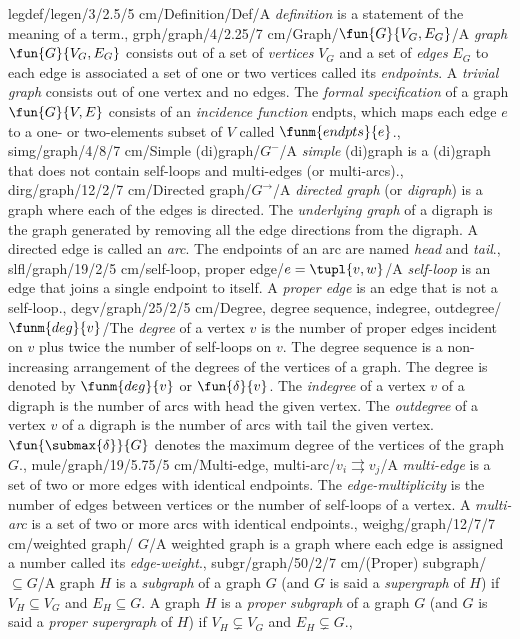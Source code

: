legdef/legen/3/2.5/5 cm/Definition/Def/{A \emph{definition} is a statement of the meaning of a term.},%
grph/graph/4/2.25/7 cm/Graph/{$\fun{G}{V_G,E_G}$}/{A \emph{graph} $\fun{G}{V_G,E_G}$ consists out of a set of \emph{vertices} $V_G$ and a set of \emph{edges} $E_G$ to each edge is associated a set of one or two vertices called its \emph{endpoints}. A \emph{trivial graph} consists out of one vertex and no edges. The \emph{formal specification} of a graph $\fun{G}{V,E}$ consists of an \emph{incidence function} $\mbox{endpts}$, which maps each edge $e$ to a one- or two-elements subset of $V$ called $\funm{endpts}{e}$.},
simg/graph/4/8/7 cm/{Simple (di)graph}/$G^{-}$/{A \emph{simple} (di)graph is a (di)graph that does not contain self-loops and multi-edges (or multi-arcs).},
dirg/graph/12/2/7 cm/{Directed graph}/$G^{\rightarrow}$/{A \emph{directed graph} (or \emph{digraph}) is a graph where each of the edges is directed. The \emph{underlying graph} of a digraph is the graph generated by removing all the edge directions from the digraph. A directed edge is called an \emph{arc}. The endpoints of an arc are named \emph{head} and \emph{tail}.},
slfl/graph/19/2/5 cm/{self-loop, proper edge}/{$e=\tupl{v,w}$}/{A \emph{self-loop} is an edge that joins a single endpoint to itself. A \emph{proper edge} is an edge that is not a self-loop.},
degv/graph/25/2/5 cm/{Degree, degree sequence, indegree, outdegree}/{$\funm{deg}{v}$}/{The \emph{degree} of a vertex $v$ is the number of proper edges incident on $v$ plus twice the number of self-loops on $v$. The degree sequence is a non-increasing arrangement of the degrees of the vertices of a graph. The degree is denoted by $\funm{deg}{v}$ or $\fun{\delta}{v}$. The \emph{indegree} of a vertex $v$ of a digraph is the number of arcs with head the given vertex. The \emph{outdegree} of a vertex $v$ of a digraph is the number of arcs with tail the given vertex. $\fun{\submax{\delta}}{G}$ denotes the maximum degree of the vertices of the graph $G$.},
mule/graph/19/5.75/5 cm/{Multi-edge, multi-arc}/$v_i\rightrightarrows v_j$/{A \emph{multi-edge} is a set of two or more edges with identical endpoints. The \emph{edge-multiplicity} is the number of edges between vertices or the number of self-loops of a vertex. A \emph{multi-arc} is a set of two or more arcs with identical endpoints.},
weighg/graph/12/7/7 cm/{weighted graph}/{\textlinb{\BPtalent} $G$}/{A weighted graph is a graph where each edge is assigned a number called its \emph{edge-weight}.},
subgr/graph/50/2/7 cm/{(Proper) subgraph}/{$\subseteq G$}/{A graph $H$ is a \emph{subgraph} of a graph $G$ (and $G$ is said a \emph{supergraph} of $H$) if $V_H\subseteq V_G$ and $E_H\subseteq G$. A graph $H$ is a \emph{proper subgraph} of a graph $G$ (and $G$ is said a \emph{proper supergraph} of $H$) if $V_H\subsetneq V_G$ and $E_H\subsetneq G$.},
